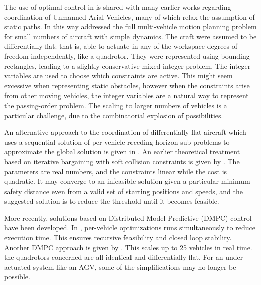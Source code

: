 The use of optimal control in \cite{DeCampos2017} is shared with many earlier works regarding coordination of Unmanned Arial Vehicles, many of which relax the assumption of static paths. In this way \cite{Schouwenaars2004} addressed the full multi-vehicle motion planning problem for small numbers of aircraft with simple dynamics. The craft were assumed to be differentially flat: that is, able to actuate in any of the workspace degrees of freedom independently, like a quadrotor. They were represented using bounding rectangles, leading to a slightly conservative mixed integer problem. The integer variables are used to choose which constraints are active. This might seem excessive when representing static obstacles, however when the constraints arise from other moving vehicles, the integer variables are a natural way to represent the passing-order problem. The scaling to larger numbers of vehicles is a particular challenge, due to the combinatorial explosion of possibilities.

An alternative approach to the coordination of differentially flat aircraft which uses a sequential solution of per-vehicle receding horizon sub problems to approximate the global solution is given in \cite{Keviczky2008}. An earlier theoretical treatment based on iterative bargaining with soft collision constraints is given by \cite{Inalhan2002}. The parameters are real numbers, and the constraints linear while the cost is quadratic. It may converge to an infeasible solution given a particular minimum safety distance even from a valid set of starting positions and speeds, and the suggested solution is to reduce the threshold until it becomes feasible.  

More recently, solutions based on Distributed Model Predictive (DMPC) control have been developed. In \cite{Dai2017}, per-vehicle optimizations runs simultaneously to reduce execution time. This ensures recursive feasibility and closed loop stability. Another DMPC approach is given by \cite{Luis2018}. This scales up to 25 vehicles in real time. the quadrotors concerned are all identical and differentially flat. For an under-actuated system like an AGV, some of the simplifications may no longer be possible.
